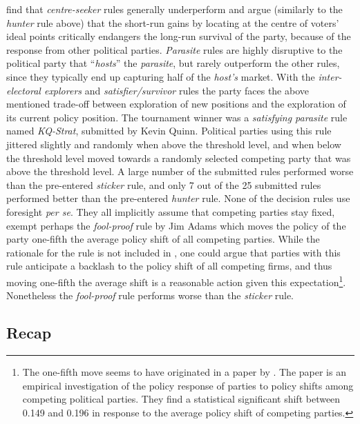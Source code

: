 \documentclass[preprint, 12pt]{elsarticle}
\begin{document}
\citet{Fowler_Laver_2008} find that \emph{centre-seeker} rules generally underperform and argue (similarly to the \emph{hunter} rule above) that the short-run gains by locating at the centre of voters' ideal points critically endangers the long-run survival of the party, because of the response from other political parties. \emph{Parasite} rules are highly disruptive to the political party that ``\emph{hosts}'' the \emph{parasite}, but rarely outperform the other rules, since they typically end up capturing half of the \emph{host's} market. With the \emph{inter-electoral explorers} and \emph{satisfier/survivor} rules the party faces the above mentioned trade-off between exploration of new positions and the exploration of its current policy position. The tournament winner was a \emph{satisfying parasite} rule named \emph{KQ-Strat}, submitted by Kevin Quinn. Political parties using this rule jittered slightly and randomly when above the threshold level, and when below the threshold level moved towards a randomly selected competing party that was above the threshold level. A large number of the submitted rules performed worse than the pre-entered \emph{sticker} rule, and only 7 out of the 25 submitted rules performed better than the pre-entered \emph{hunter} rule. None of the decision rules use foresight \emph{per se}. They all implicitly assume that competing parties stay fixed, exempt perhaps the \emph{fool-proof} rule by Jim Adams which moves the policy of the party one-fifth the average policy shift of all competing parties. While the rationale for the rule is not included in \citet{Fowler_Laver_2008}, one could argue that parties with this rule anticipate a backlash to the policy shift of all competing firms, and thus moving one-fifth the average shift is a reasonable action given this expectation\footnote{The one-fifth move seems to have originated in a paper by \citet{Adams_Somer-Topcu_2009}. The paper is an empirical investigation of the policy response of parties to policy shifts among competing political parties. They find a statistical significant shift between 0.149 and 0.196 in response to the average policy shift of competing parties.}. Nonetheless the \emph{fool-proof} rule performs worse than the \emph{sticker} rule.

\subsection*{Recap}
\end{document}
